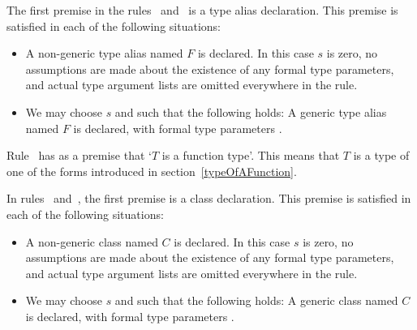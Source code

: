 \documentclass[makeidx]{article}
\begin{document}
{

\LMHash{}%
The first premise in the
rules~\SrnLeftTypeAlias{} and~\SrnRightTypeAlias{}
is a type alias declaration.
This premise is satisfied in each of the following situations:

\begin{itemize}
\item A non-generic type alias named $F$ is declared.
  In this case $s$ is zero,
  no assumptions are made about the existence
  of any formal type parameters,
  and actual type argument lists are omitted everywhere in the rule.
\item We may choose $s$ and  such that the following holds:
  A generic type alias named $F$ is declared,
  with formal type parameters .
\end{itemize}

\LMHash{}%
Rule~\SrnRightFunction{} has as a premise that `$T$ is a function type'.
This means that $T$ is a type of one of the forms introduced in
section~\ref{typeOfAFunction}.

\LMHash{}%
In rules~\SrnCovariance{} and~\SrnSuperinterface{},
the first premise is a class declaration.
This premise is satisfied in each of the following situations:

\begin{itemize}
\item A non-generic class named $C$ is declared.
  In this case $s$ is zero,
  no assumptions are made about the existence
  of any formal type parameters,
  and actual type argument lists are omitted everywhere in the rule.
\item We may choose $s$ and  such that the following holds:
  A generic class named $C$ is declared,
  with formal type parameters .
\end{itemize}

}
\end{document}
